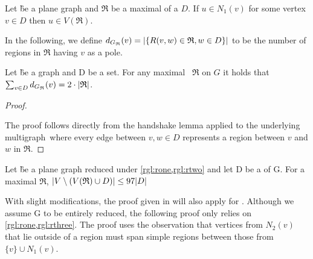 \begin{lemma}\label{lemma:noneinside}
    \cite[Lemma 6]{Alber2004}
    Let \G be a plane graph and $\mathfrak{R}$ be a maximal \dreg of a \dom $D$. If $u \in N_1(v)$ for some vertex $v \in D$ then $u \in V(\mathfrak{R})$.
    
\end{lemma}
In the following, we define $d_{G_{\mathfrak{R}}}(v) = \abs{\{R(v,w) \in \mathfrak{R}, w \in D\}}$ to be the number of regions in $\mathfrak{R}$ having $v$ as a pole. 

\begin{corollary}
    Let \G be a graph and D be a set. For any maximal \dreg~$\mathfrak{R}$ on $G$ it holds that $\sum_{v \in D} d_{G_{\mathfrak{R}}}(v) = 2 \cdot \abs{\mathfrak{R}}$.
\end{corollary}
\begin{proof}\label{lemma:polesBound}
    
    The proof follows directly from the handshake lemma applied to the underlying multigraph~\GR where every edge between $v,w \in D$ represents a region between $v$ and $w$ in $\mathfrak{R}$.
\end{proof}

\begin{proposition}\label{lemma:outside}
    Let \G be a plane graph reduced under \cref*{rgl:rone,rgl:rtwo} and let D be a \sdom of G. For a maximal \dreg $\mathfrak{R}$,  $\abs{V \setminus (V(\mathfrak{R}) \cup D)} \leq 97 \abs{D}$
\end{proposition}

With slight modifications, the proof given in \cite[Revision 2014]{Garnero2018} will also apply for \sdom. Although we assume G to be entirely reduced, the following proof only relies on \cref{rgl:rone,rgl:rthree}. The proof uses the observation that vertices from $N_2(v)$ that lie outside of a region must span simple regions between those from $\{v\} \cup N_1(v)$.


